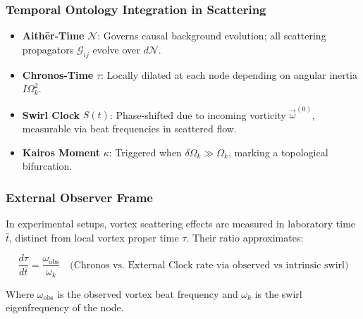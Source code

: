 \subsubsection*{Temporal Ontology Integration in Scattering}

\begin{itemize}
    \item \textbf{Aithēr-Time} \( \mathcal{N} \): Governs causal background evolution; all scattering propagators \( \mathcal{G}_{ij} \) evolve over \( d\mathcal{N} \).
    \item \textbf{Chronos-Time} \( \tau \): Locally dilated at each node depending on angular inertia \( I \Omega_k^2 \).
    \item \textbf{Swirl Clock} \( S(t) \): Phase-shifted due to incoming vorticity \( \vec{\omega}^{(0)} \), measurable via beat frequencies in scattered flow.
    \item \textbf{Kairos Moment} \( \kappa \): Triggered when \(\delta \Omega_k \gg \Omega_k\), marking a topological bifurcation.
\end{itemize}

\subsubsection*{External Observer Frame}

In experimental setups, vortex scattering effects are measured in laboratory time \( \bar{t} \), distinct from local vortex proper time \( \tau \). Their ratio approximates:

\[
    \frac{d\tau}{d\bar{t}} = \frac{\omega_\text{obs}}{\omega_k} \quad \text{(Chronos vs. External Clock rate via observed vs intrinsic swirl)}

\]

Where \( \omega_\text{obs} \) is the observed vortex beat frequency and \( \omega_k \) is the swirl eigenfrequency of the node.
